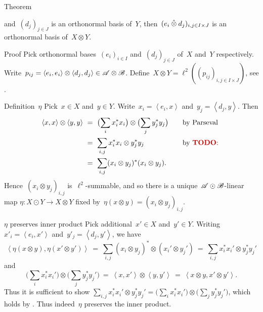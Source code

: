 \documentclass[b]{subfiles}
\begin{document}
\begin{parsec}
\begin{point}{Theorem}
\begin{enumerate}
                and~$(d_j)_{j \in J}$ is an orthonormal basis of~$Y$,
                then~$(e_i \mathbin{\hat{\otimes}} d_j)_{i,j\in I\times J}$
                is an orthonormal basis of~$X \otimes Y$.
\end{enumerate}
\begin{point}{Proof}%
Pick orthonormal bases~$(e_i)_{i \in I}$ and~$(d_j)_{j \in J}$ of~$X$
    and~$Y$ respectively.
Write~$p_{ij} = \left<e_i, e_i\right>\otimes \left<d_j,d_j\right>
    \in \mathscr{A} \otimes \mathscr{B}$.
Define~$X \otimes Y = \ell^2((p_{ij})_{i,j \in I\times J})$,
    see .
\begin{point}{Definition~$\eta$}%
Pick~$x \in X$ and~$y \in Y$.
Write~$x_i = \left<e_i, x\right>$
and~$y_j = \left<d_j, y\right>$.
Then
\begin{align*}
    \left<x,x\right> \otimes \left<y,y\right>
    &\ = \ \bigl( \sum_i x_i^*x_i\bigr) \otimes\bigl(\sum_jy_j^*y_j\bigr)
            &\quad&\text{by Parseval}  \\
            &\ = \ \sum_{i,j}  x_i^*x_i  \otimes y_j^*y_j  &&\text{by \TODO{}}\\
            &\ = \ \sum_{i,j}  (x_i \otimes y_j)^* (x_i  \otimes y_j).
\end{align*}
Hence~$(x_i \otimes y_j)_{i,j}$ is~$\ell^2$-summable,
    and so there is a unique~$\mathscr{A} \odot\mathscr{B}$-linear map
    $\eta\colon X \odot Y \to X \otimes Y$ fixed
    by~$\eta(x \otimes y) = (x_i \otimes y_j)_{i,j}$.
\end{point}
\begin{point}{$\eta$ preserves inner product}%
Pick additional~$x' \in X$ and~$y' \in Y$.
Writing~$x'_i = \left<e_i,x'\right>$
    and~$y'_j = \left<d_j, y'\right>$,
we have
\begin{equation*}
    \left<\eta(x\otimes y), \eta(x' \otimes y')\right>
    \ = \ \sum_{i,j} (x_i\otimes y_j)^* \otimes (x_i' \otimes y_j')
    \ = \ \sum_{i,j} x_i^*x_i' \otimes y_j^* y_j'
\end{equation*}
and
\begin{equation*}
    \bigl(\sum_i x_i^*x_i'\bigr) \otimes \bigl( \sum_j y_j^* y_j' \bigr)
    \ = \ \left<x,x'\right> \otimes \left<y,y'\right>
    \ = \ \left<x\otimes y,x' \otimes y'\right> .
\end{equation*}
Thus it is sufficient to show
$\sum_{i,j} x_i^*x_i' \otimes y_j^* y_j'
    = \bigl(\sum_i x_i^*x_i'\bigr) \otimes \bigl( \sum_j y_j^* y_j' \bigr)$,
    which holds by \TODO{}.
Thus indeed~$\eta$ preserves the inner product.

\end{point}
\end{point}
\end{point}
\end{parsec}
\end{document}
